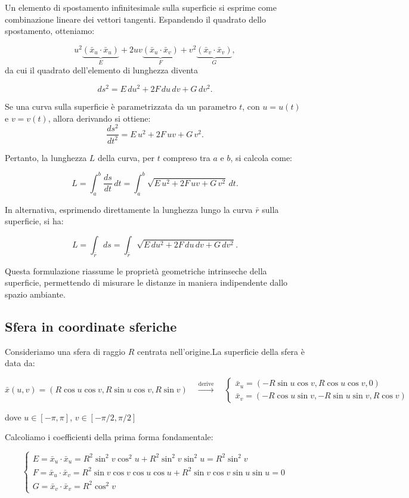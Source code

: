 Un elemento di spostamento infinitesimale sulla superficie si esprime come combinazione lineare dei vettori tangenti. Espandendo il quadrato dello spostamento, otteniamo:

$$
u^2\underbrace{\left(\bar{x}_u \cdot \bar{x}_u\right)}_E + 2uv\underbrace{\left(\bar{x}_u \cdot \bar{x}_v\right)}_F + v^2\underbrace{\left(\bar{x}_v \cdot \bar{x}_v\right)}_G,
$$
da cui il quadrato dell'elemento di lunghezza diventa

$$
ds^2 = E\,du^2 + 2F\,du\,dv + G\,dv^2.
$$

Se una curva sulla superficie è parametrizzata da un parametro $t$, con $u = u(t)$ e $v = v(t)$, allora derivando si ottiene:
$$
\frac{ds^2}{dt^2} = E\, u^2 + 2F\,uv + G\,v^2.
$$

Pertanto, la lunghezza $L$ della curva, per $t$ compreso tra $a$ e $b$, si calcola come:

$$
L = \int_a^b \frac{ds}{dt}\, dt = \int_a^b \sqrt{E\, u^2 + 2F\,uv + G\,v^2}\, dt.
$$

In alternativa, esprimendo direttamente la lunghezza lungo la curva $\bar{r}$ sulla superficie, si ha:

$$
L = \int_{\bar{r}} ds = \int_{\bar{r}} \sqrt{E\,du^2 + 2F\,du\,dv + G\,dv^2}.
$$

Questa formulazione riassume le proprietà geometriche intrinseche della superficie, permettendo di misurare le distanze in maniera indipendente dallo spazio ambiante.


\subsection{Sfera in coordinate sferiche}

Consideriamo una sfera di raggio $R$ centrata nell'origine.La superficie della sfera è data da:

\small
$$
\bar x(u,v) = (R \cos u \cos v, R \sin u \cos v, R \sin v)
\quad \xrightarrow{\text{derive}} \quad
\begin{cases}
    \bar x_u = (-R \sin u \cos v, R \cos u \cos v, 0)
    \\
    \bar x_v = (-R \cos u \sin v, -R \sin u \sin v, R \cos v)
\end{cases}
$$
\normalsize

dove $u \in [-\pi, \pi]$, $v \in [-\pi/2, \pi/2]$

Calcoliamo i coefficienti della prima forma fondamentale:

$$
\begin{cases}
E = \bar{x}_u \cdot \bar{x}_u = R^2 \sin^2 v \cos^2 u + R^2 \sin^2 v \sin^2 u = R^2 \sin^2 v
\\
F = \bar{x}_u \cdot \bar{x}_v = R^2 \sin v \cos v \cos u \cos u + R^2 \sin v \cos v \sin u \sin u = 0
\\
G = \bar{x}_v \cdot \bar{x}_v = R^2 \cos^2 v
\end{cases}
$$

